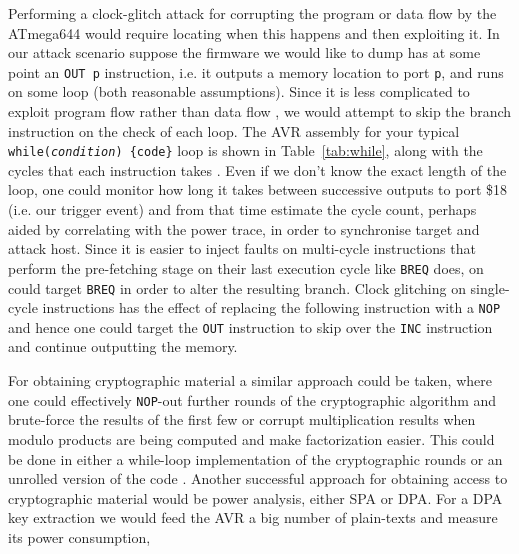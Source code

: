 Performing a clock-glitch attack for corrupting the program or data flow by the ATmega644 would require locating when this happens and then exploiting it. In our attack scenario suppose the firmware we would like to dump has at some point an \texttt{OUT p} instruction, i.e. it outputs a memory location to port \texttt{p}, and runs on some loop (both reasonable assumptions). Since it is less complicated to exploit program flow rather than data flow \citep{glitches_paper}, we would attempt to skip the branch instruction on the check of each loop. The AVR assembly for your typical  \texttt{while(\emph{condition}) \{code\}} loop is shown in Table~\ref{tab:while}, along with the cycles that each instruction takes \citep{atmega_manual}. Even if we don't know the exact length of the loop, one could monitor how long it takes between successive outputs to port \$18 (i.e. our trigger event) and from that time estimate the cycle count, perhaps aided by correlating with the power trace, in order to synchronise target and attack host. Since it is easier to inject faults on multi-cycle instructions that perform the pre-fetching stage on their last execution cycle \citep{glitches_paper} like \texttt{BREQ} does, on could target \texttt{BREQ} in order to alter the resulting branch. Clock glitching on single-cycle instructions has the effect of replacing the following instruction with a \texttt{NOP} \citep{glitches_paper} and hence one could target the \texttt{OUT} instruction to skip over the \texttt{INC} instruction and continue outputting the memory.

For obtaining cryptographic material a similar approach could be taken, where one could effectively \texttt{NOP}-out further rounds of the cryptographic algorithm and brute-force the results of the first few \citep{glitches_paper}\citep{sergei:thesis} or corrupt multiplication results when modulo products are being computed and make factorization easier\citep{anderson:cautionary_note}. This could be done in either a while-loop implementation of the cryptographic rounds or an unrolled version of the code \citep{glitches_paper}. Another successful approach for obtaining access to cryptographic material would be power analysis, either SPA or DPA. For a DPA key extraction we would feed the AVR a big number of plain-texts and measure its power consumption,  

